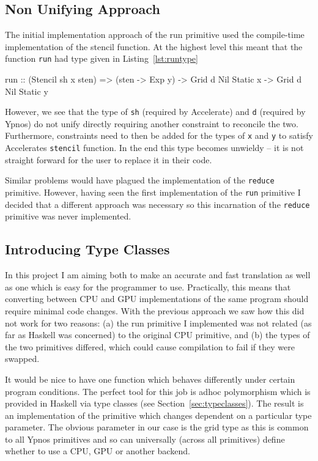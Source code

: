 \documentclass[12pt,a4paper,oneside]{scrbook}
\begin{document}
\subsection{Non Unifying Approach}

The initial implementation approach of the run primitive used the compile-time
implementation of the stencil function. At the highest level this meant that the
function \texttt{run} had type given in Listing~\ref{lst:runtype}

\begin{hflisting}[label={lst:runtype}, caption=The type of run required by Accelerate.]
run :: (Stencil sh x sten) =>
       (sten -> Exp y) -> Grid d Nil Static x -> Grid d Nil Static y
\end{hflisting}

However, we see that the type of \texttt{sh} (required by Accelerate) and
\texttt{d} (required by Ypnos) do not unify directly requiring another
constraint to reconcile the two. Furthermore, constraints need to then be added
for the types of \texttt{x} and \texttt{y} to satisfy Accelerates
\texttt{stencil} function. In the end this type becomes unwieldy -- it is not
straight forward for the user to replace it in their code.

Similar problems would have plagued the implementation of the \texttt{reduce}
primitive. However, having seen the first implementation of the \texttt{run}
primitive I decided that a different approach was necessary so this incarnation
of the \texttt{reduce} primitive was never implemented.

\subsection{Introducing Type Classes}

In this project I am aiming both to make an accurate and fast translation as
well as one which is easy for the programmer to use.  Practically, this means
that converting between CPU and GPU implementations of the same program should
require minimal code changes.  With the previous approach we saw how this did
not work for two reasons: (a) the run primitive I implemented was not related
(as far as Haskell was concerned) to the original CPU primitive, and (b) the
types of the two primitives differed, which could cause compilation to fail if
they were swapped.

It would be nice to have one function which behaves differently under certain
program conditions. The perfect tool for this job is adhoc polymorphism which is
provided in Haskell via type classes (see Section~\ref{sec:typeclasses}). The result is an implementation of the
primitive which changes dependent on a particular type parameter. The obvious
parameter in our case is the grid type as this is common to all Ypnos primitives
and so can universally (across all primitives) define whether to use a CPU, GPU
or another backend.
\end{document}
